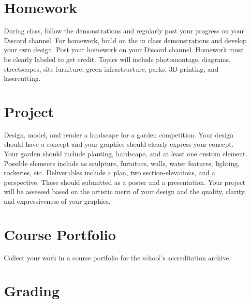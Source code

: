 \documentclass[11pt,article,oneside]{memoir}
\begin{document}
\section{Homework}

During class, follow the demonstrations 
and regularly post your progress on your Discord channel. 
For homework, 
build on the in class demonstrations 
and develop your own design.
Post your homework on your Discord channel. 
Homework must be clearly labeled to get credit.
Topics will include 
photomontage, 
diagrams,
streetscapes,
site furniture,
green infrastructure,
parks, 
3D printing, 
and lasercutting.
\\

\section{Project}

Design, model, and render
a landscape for a garden competition.
Your design should have a concept
and your graphics should clearly express your concept.
Your garden should include 
planting, hardscape, and at least one custom element.
Possible elements include as sculpture, furniture, walls, 
water features, lighting, rockeries, etc. 
Deliverables include a plan, two section-elevations, and a perspective.
These should submitted as a poster and a presentation.
Your project will be assessed based on
the artistic merit of your design
and the quality, clarity, and expressiveness
of your graphics. 
\\


\section{Course Portfolio}

Collect your work in a course portfolio
for the school's accreditation archive.
\\

\section{Grading}
\end{document}
